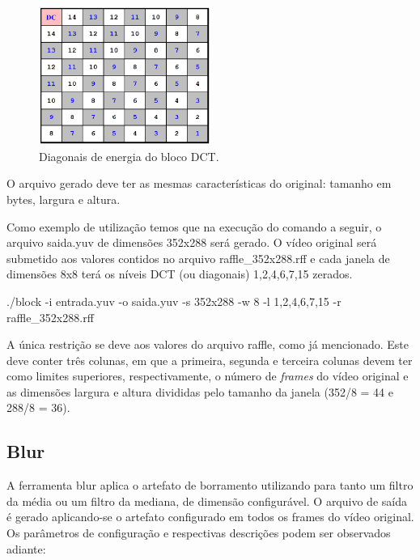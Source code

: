 \begin{figure}[!htb]
	\centering
	\includegraphics[width=0.5\textwidth]{./imgs/niveisdct.png}
	\caption{Diagonais de energia do bloco DCT.}
	\label{fig:niveisdct}
	\fonte{\cite{}}
\end{figure}

O arquivo gerado deve ter as mesmas características do original: tamanho em bytes, largura e altura.

Como exemplo de utilização temos que na execução do comando a seguir, o arquivo saida.yuv de dimensões 352x288 será gerado. O vídeo original será submetido aos valores contidos no arquivo raffle\_352x288.rff e cada janela de dimensões 8x8 terá os níveis DCT (ou diagonais) 1,2,4,6,7,15 zerados.

./block -i entrada.yuv -o saida.yuv -s 352x288 -w 8 -l 1,2,4,6,7,15 -r raffle\_352x288.rff

A única restrição se deve aos valores do arquivo raffle, como já mencionado. Este deve conter três colunas, em que a primeira, segunda e terceira colunas devem ter como limites superiores, respectivamente, o número de \emph{frames} do vídeo original e as dimensões largura e altura divididas pelo tamanho da janela (352/8 = 44 e 288/8 = 36).

\subsection{Blur}

A ferramenta blur aplica o artefato de borramento utilizando para tanto um filtro da média ou um filtro da mediana, de dimensão configurável. O arquivo de saída é gerado aplicando-se o artefato configurado em todos os frames do vídeo original. Os parâmetros de configuração e respectivas descrições podem ser observados adiante:

